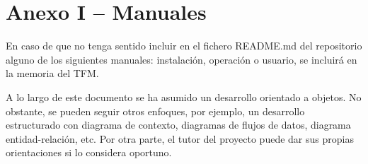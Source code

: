 \vspace*{-2cm}


\section*{Anexo I – Manuales} %
\label{anexo:manuales}


En caso de que no tenga sentido incluir en el fichero README.md del repositorio alguno de los siguientes manuales: instalación, operación o usuario, se incluirá en la memoria del TFM.

A lo largo de este documento se ha asumido un desarrollo orientado a objetos. No obstante, se pueden seguir otros enfoques, por ejemplo, un desarrollo estructurado con diagrama de contexto, diagramas de flujos de datos, diagrama entidad-relación, etc.
Por otra parte, el tutor del proyecto puede dar sus propias orientaciones si lo considera oportuno.

